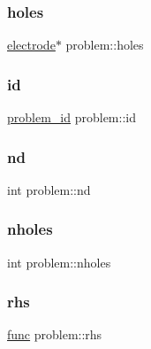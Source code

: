 \mbox{\label{structproblem_a3f48c6e1ab38d32f3438b375c49af9f0}} 
\subsubsection{\texorpdfstring{holes}{holes}}
{\footnotesize\ttfamily \mbox{\hyperlink{structelectrode}{electrode}}$\ast$ problem\+::holes}

\mbox{\label{structproblem_a510ac3e585f726934ca1458ab5a3ad3b}} 
\subsubsection{\texorpdfstring{id}{id}}
{\footnotesize\ttfamily \mbox{\hyperlink{problem_8h_acef34e4550d8d3c9873193b0aad44fa0}{problem\+\_\+id}} problem\+::id}

\mbox{\label{structproblem_a109622aa6f753238fb5d9fd0e350e387}} 
\subsubsection{\texorpdfstring{nd}{nd}}
{\footnotesize\ttfamily int problem\+::nd}

\mbox{\label{structproblem_ad2636a340da9884c974134d5ec84305a}} 
\subsubsection{\texorpdfstring{nholes}{nholes}}
{\footnotesize\ttfamily int problem\+::nholes}

\mbox{\label{structproblem_af65ffdbb0d3d9637c2203edd6ea6b635}} 
\subsubsection{\texorpdfstring{rhs}{rhs}}
{\footnotesize\ttfamily \mbox{\hyperlink{base_8h_a6dd92a1df4b8b4a265cd65db9907ebe5}{func}} problem\+::rhs}

